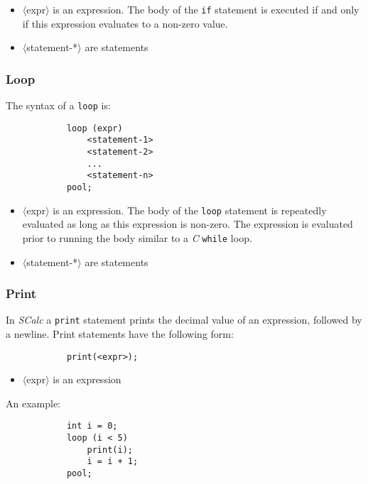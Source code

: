 \documentclass{article}
\newcommand{\code}[1]{\texttt{\textmd{#1}}}
\begin{document}
		\begin {itemize}
			\item{$\langle$expr$\rangle$} is an expression. The body of the \code{if} statement is executed if and only
			if this expression evaluates to a non-zero value.
			\item{$\langle$statement-*$\rangle$} are statements
		\end{itemize}


	\subsubsection{Loop}

		The syntax of a \code{loop} is:

		\begin{lstlisting}
			loop (expr)
				<statement-1>
				<statement-2>
				...
				<statement-n>
			pool;
		\end{lstlisting}

		\begin {itemize}
			\item{$\langle$expr$\rangle$} is an expression. The body of the \texttt{loop} statement is repeatedly evaluated as long as
			this expression is non-zero. The expression is evaluated prior to running the body similar to a \textit{C} \texttt{while} loop.
			\item{$\langle$statement-*$\rangle$} are statements
		\end{itemize}


	\subsubsection{Print}

		In \textit{SCalc} a \texttt{print} statement prints the decimal value of an expression, followed by a newline.
		Print statements have the following form:

		\begin{lstlisting}
			print(<expr>);
		\end{lstlisting}

		\begin{itemize}
			\item{$\langle$expr$\rangle$} is an expression
		\end{itemize}

		An example:

		\begin{lstlisting}
			int i = 0;
			loop (i < 5)
				print(i);
				i = i + 1;
			pool;
		\end{lstlisting}
\end{document}
